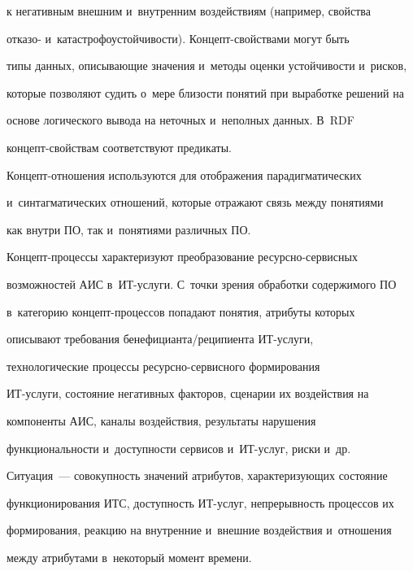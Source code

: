 к негативным внешним и~внутренним воздействиям (например, свойства 


отказо- и~катастрофоустойчивости). Кон\-цепт-свой\-ст\-ва\-ми могут быть 


типы данных, описывающие значения и~методы оценки устойчивости и~рисков, 


которые позволяют судить о~мере близости понятий при выработке решений на 


основе логического вывода на неточных и~неполных данных. В~RDF  


кон\-цепт-свой\-ст\-вам соответствуют предикаты. 


  


  Концепт-отношения используются для отображения парадигматических 


и~синтагматических отношений, которые отражают связь между понятиями 


как внутри ПО, так и~понятиями различных ПО.


  


  Концепт-процессы характеризуют преобразование ресурсно-сервисных 


возможностей АИС в~ИТ-услуги. С~точки зрения обработки содержимого ПО 


в~категорию концепт-процессов попадают понятия, атрибуты которых 


описывают требования бе\-не\-фи\-ци\-ан\-та\!/\!ре\-ци\-пи\-ен\-та ИТ-ус\-лу\-ги, 


технологические процессы ре\-сурс\-но-сер\-вис\-но\-го формирования  


ИТ-ус\-лу\-ги, состояние негативных факторов, сценарии их воздействия на 


компоненты АИС, каналы воздействия, результаты нарушения 


функциональности и~доступности сервисов и~ИТ-услуг, риски и~др.


  


  Ситуация~--- совокупность значений атрибутов, характеризующих состояние 


функционирования ИТС, доступность ИТ-услуг, непрерывность процессов их 


формирования, реакцию на внутренние и~внешние воздействия и~отношения 


между атрибутами в~некоторый момент времени.


  


